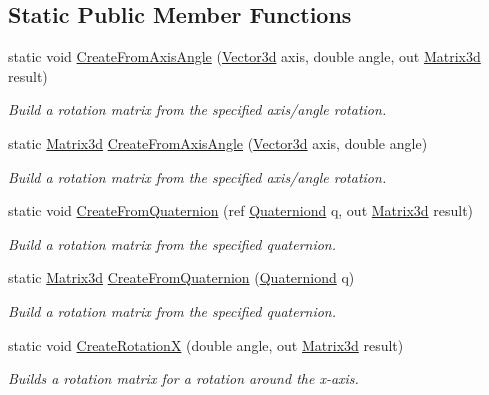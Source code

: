 \subsection*{Static Public Member Functions}
\begin{DoxyCompactItemize}
\item 
static void \hyperlink{struct_open_t_k_1_1_matrix3d_ad4fd51b6dec88608774c98b92658d360}{Create\-From\-Axis\-Angle} (\hyperlink{struct_open_t_k_1_1_vector3d}{Vector3d} axis, double angle, out \hyperlink{struct_open_t_k_1_1_matrix3d}{Matrix3d} result)
\begin{DoxyCompactList}\small\item\em Build a rotation matrix from the specified axis/angle rotation. \end{DoxyCompactList}\item 
static \hyperlink{struct_open_t_k_1_1_matrix3d}{Matrix3d} \hyperlink{struct_open_t_k_1_1_matrix3d_ab5fca3df739ad019b75f9dbcd39c3d4a}{Create\-From\-Axis\-Angle} (\hyperlink{struct_open_t_k_1_1_vector3d}{Vector3d} axis, double angle)
\begin{DoxyCompactList}\small\item\em Build a rotation matrix from the specified axis/angle rotation. \end{DoxyCompactList}\item 
static void \hyperlink{struct_open_t_k_1_1_matrix3d_ad5bb2bceb1f7ec62c80dd81946cd429a}{Create\-From\-Quaternion} (ref \hyperlink{struct_open_t_k_1_1_quaterniond}{Quaterniond} q, out \hyperlink{struct_open_t_k_1_1_matrix3d}{Matrix3d} result)
\begin{DoxyCompactList}\small\item\em Build a rotation matrix from the specified quaternion. \end{DoxyCompactList}\item 
static \hyperlink{struct_open_t_k_1_1_matrix3d}{Matrix3d} \hyperlink{struct_open_t_k_1_1_matrix3d_a95a8653814c51c1a0d99a2c9e3235e10}{Create\-From\-Quaternion} (\hyperlink{struct_open_t_k_1_1_quaterniond}{Quaterniond} q)
\begin{DoxyCompactList}\small\item\em Build a rotation matrix from the specified quaternion. \end{DoxyCompactList}\item 
static void \hyperlink{struct_open_t_k_1_1_matrix3d_a8bae023b83fd31ea2c16cdb6dedf5b40}{Create\-Rotation\-X} (double angle, out \hyperlink{struct_open_t_k_1_1_matrix3d}{Matrix3d} result)
\begin{DoxyCompactList}\small\item\em Builds a rotation matrix for a rotation around the x-\/axis. \end{DoxyCompactList}\item 

\end{DoxyCompactItemize}
